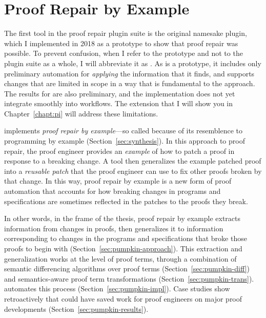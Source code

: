 \chapter{Proof Repair by Example}
\label{ch:example}

The first tool in the \sysnamelong proof repair plugin suite is the original namesake \sysnamelong plugin, which I implemented in 2018 as a prototype to show that proof repair was possible.
To prevent confusion, when I refer to the \sysnamelong prototype and not to the plugin suite as a whole, I will abbreviate it as \sysname.
As \sysname is a prototype, it includes only preliminary automation for \textit{applying} the information that it finds,
and supports changes that are limited in scope in a way that is fundamental to the approach.
The results for \sysname are also preliminary, and the implementation does not yet integrate smoothly into  workflows.
The \toolnamec extension that I will show you in Chapter~\ref{chapt:pi} will address these limitations.

\sysname implements \textit{proof repair by example}---so called because of its resemblence to programming by example (Section~\ref{sec:synthesis}).
In this approach to proof repair, the proof engineer provides an \textit{example} of how to patch a proof in response to a breaking change.
A tool then generalizes the example patched proof into a \textit{reusable patch} that the proof engineer can use to fix other proofs broken by that change.
In this way, proof repair by example is a new form of proof automation that accounts for how 
breaking changes in programs and specifications are sometimes reflected in the patches to the proofs they break.

In other words, in the frame of the thesis, proof repair by example extracts information from changes in proofs,
then generalizes it to information corresponding to changes in the programs and specifications that broke those proofs to begin with (Section~\ref{sec:pumpkin-approach}).
This extraction and generalization works at the level of proof terms, through a combination of semantic differencing algorithms 
over proof terms (Section~\ref{sec:pumpkin-diff}) and 
semantics-aware proof term transformations (Section~\ref{sec:pumpkin-trans}).
\sysname automates this process (Section~\ref{sec:pumpkin-impl}).
Case studies show retroactively that \sysname could have saved work for proof engineers
on major proof developments (Section~\ref{sec:pumpkin-results}).















